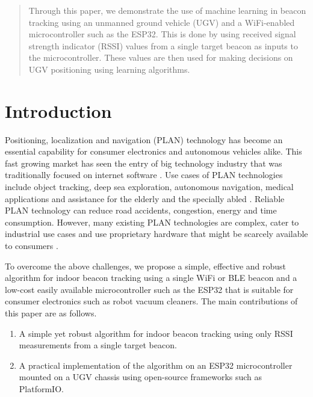 \documentclass[conference]{IEEEtran}
\begin{document}
\begin{abstract}
    Through this paper, we demonstrate the use of machine learning in beacon
    tracking using an unmanned ground vehicle (UGV) and a WiFi-enabled
    microcontroller such as the ESP32. This is done by using received signal
    strength indicator (RSSI) values from a single target beacon as inputs to
    the microcontroller. These values are then used for making decisions on UGV
    positioning using learning algorithms. 
\end{abstract}

\section{Introduction}
\label{sec:intro}
Positioning, localization and navigation (PLAN) technology has become an
essential capability for consumer electronics and autonomous vehicles alike.
This fast growing market has seen the entry of big technology industry that was
traditionally focused on internet software
\cite{el-sheimyIndoorNavigationState2021}. Use cases of PLAN technologies
include object tracking, deep sea exploration, autonomous navigation, medical
applications and assistance for the elderly and the specially abled
\cite{laoudiasSurveyEnablingTechnologies2018,farahsariSurveyIndoorPositioning2022}.
Reliable PLAN technology can reduce road accidents, congestion, energy and time
consumption. However, many existing PLAN technologies are complex, cater to
industrial use cases and use proprietary hardware that might be scarcely
available to consumers
\cite{guSurveyIndoorPositioning2009,liuSurveyWirelessIndoor2007}.

To overcome the above challenges, we propose a simple, effective and robust
algorithm for indoor beacon tracking using a single WiFi or BLE beacon and a
low-cost easily available microcontroller such as the ESP32 that is suitable for
consumer electronics such as robot vacuum cleaners. The main contributions of
this paper are as follows.

\begin{enumerate}
    \item A simple yet robust algorithm for indoor beacon tracking using only
    RSSI measurements from a single target beacon.
    \item A practical implementation of the algorithm on an ESP32
    microcontroller mounted on a UGV chassis using open-source frameworks such
    as PlatformIO.
\end{enumerate}
\end{document}

